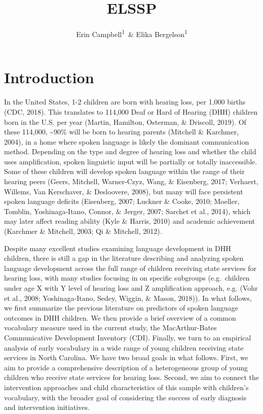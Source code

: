 \documentclass[english,man]{apa6}
\author{Erin Campbell\textsuperscript{1}\ \& Elika Bergelson\textsuperscript{1}}
\affiliation{
\vspace{0.5cm}
\textsuperscript{1} Duke University}
\title{ELSSP}
\date{}
\begin{document}
\maketitle

\hypertarget{introduction}{%
\section{Introduction}\label{introduction}}

In the United States, 1-2 children are born with hearing loss, per 1,000 births (CDC, 2018). This translates to 114,000 Deaf or Hard of Hearing (DHH) children born in the U.S. per year (Martin, Hamilton, Osterman, \& Driscoll, 2019). Of these 114,000, \textasciitilde{}90\% will be born to hearing parents (Mitchell \& Karchmer, 2004), in a home where spoken language is likely the dominant communication method. Depending on the type and degree of hearing loss and whether the child uses amplification, spoken linguistic input will be partially or totally inaccessible. Some of these children will develop spoken language within the range of their hearing peers (Geers, Mitchell, Warner-Czyz, Wang, \& Eisenberg, 2017; Verhaert, Willems, Van Kerschaver, \& Desloovere, 2008), but many will face persistent spoken language deficits (Eisenberg, 2007; Luckner \& Cooke, 2010; Moeller, Tomblin, Yoshinaga-Itano, Connor, \& Jerger, 2007; Sarchet et al., 2014), which may later affect reading ability (Kyle \& Harris, 2010) and academic achievement (Karchmer \& Mitchell, 2003; Qi \& Mitchell, 2012).

Despite many excellent studies examining language development in DHH children, there is still a gap in the literature describing and analyzing spoken language development across the full range of children receiving state services for hearing loss, with many studies focusing in on specific subgroups (e.g.~children under age X with Y level of hearing loss and Z amplification approach, e.g. (Vohr et al., 2008; Yoshinaga-Itano, Sedey, Wiggin, \& Mason, 2018)). In what follows, we first summarize the previous literature on predictors of spoken language outcomes in DHH children. We then provide a brief overview of a common vocabulary measure used in the current study, the MacArthur-Bates Communicative Development Inventory (CDI). Finally, we turn to an empirical analysis of early vocabulary in a wide range of young children receiving state services in North Carolina. We have two broad goals in what follows. First, we aim to provide a comprehensive description of a heterogeneous group of young children who receive state services for hearing loss. Second, we aim to connect the intervention approaches and child characteristics of this sample with children's vocabulary, with the broader goal of considering the success of early diagnosis and intervention initiatives.
\end{document}

